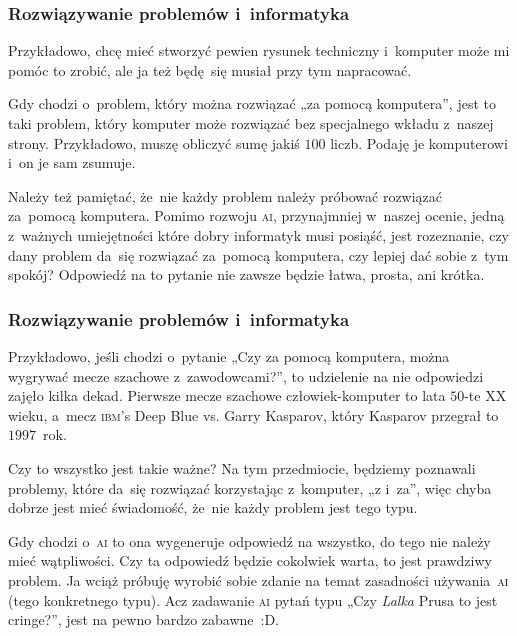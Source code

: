 \documentclass[10pt,t]{beamer}
\begin{document}
\begin{frame}
  \frametitle{Rozwiązywanie problemów i~informatyka}


  Przykładowo, chcę mieć stworzyć pewien rysunek techniczny i~komputer
  może mi pomóc to zrobić, ale ja też będę~się musiał przy tym napracować.

  Gdy chodzi o~problem, który można rozwiązać „za pomocą komputera”, jest to
  taki problem, który komputer może rozwiązać bez specjalnego wkładu
  z~naszej strony. Przykładowo, muszę obliczyć sumę jakiś $100$ liczb.
  Podaję je komputerowi i~on je sam zsumuje.

  Należy też pamiętać, że~nie każdy problem należy próbować rozwiązać
  za~pomocą komputera. Pomimo rozwoju \textsc{ai}, przynajmniej w~naszej
  ocenie, jedną z~ważnych umiejętności które dobry informatyk musi posiąść,
  jest rozeznanie, czy dany problem da~się rozwiązać za~pomocą komputera,
  czy lepiej dać sobie z~tym spokój? Odpowiedź na to pytanie nie zawsze
  będzie łatwa, prosta, ani krótka.

\end{frame}





\begin{frame}
  \frametitle{Rozwiązywanie problemów i~informatyka}


  Przykładowo, jeśli chodzi o~pytanie „Czy za pomocą komputera, można
  wygrywać mecze szachowe z~zawodowcami?”, to udzielenie na nie odpowiedzi
  zajęło kilka dekad. Pierwsze mecze szachowe człowiek-komputer to lata
  $50$-te XX wieku, a~mecz \textsc{ibm}'s Deep Blue vs. Garry Kasparov,
  który Kasparov przegrał to~$1997$~rok.

  Czy to wszystko jest takie ważne? Na tym przedmiocie, będziemy poznawali
  problemy, które da~się rozwiązać korzystając z~komputer, „z i~za”, więc
  chyba dobrze jest mieć świadomość, że~nie każdy problem jest tego typu.

  Gdy chodzi o~\textsc{ai} to ona wygeneruje odpowiedź na wszystko, do tego
  nie należy mieć wątpliwości. Czy ta odpowiedź będzie cokolwiek warta, to
  jest prawdziwy problem. Ja wciąż próbuję wyrobić sobie zdanie na temat
  zasadności używania~\textsc{ai} (tego konkretnego typu). Acz zadawanie
  \textsc{ai} pytań typu „Czy \textit{Lalka} Prusa to jest cringe?”, jest
  na pewno bardzo zabawne~:D.

\end{frame}
\end{document}
